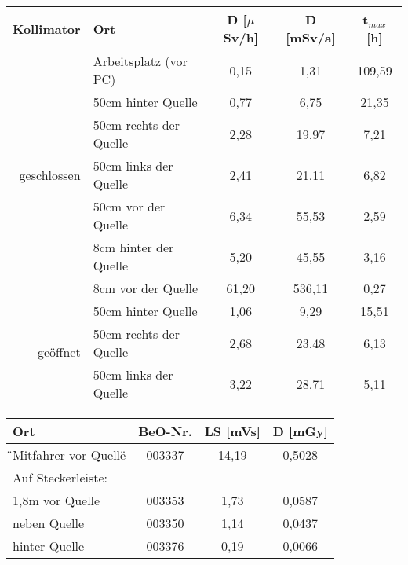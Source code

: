 \minipanf
	\begin{center}
					\begin{tabular}{rl|c|c|c}
								\textbf{Kollimator} & \textbf{Ort} & \textbf{\.D} [$\mu$Sv/h] & \textbf{\.D} [mSv/a]  & \textbf{t$_{max}$} [h]\\ 
						\hline  \multirow{7}{*}{geschlossen} &Arbeitsplatz (vor PC) & 0,15  &   1,31 & 109,59\\ 
							  &	50cm hinter Quelle    & 0,77  &   6,75 &  21,35\\ 
							  &	50cm rechts der Quelle& 2,28  &  19,97 &   7,21\\ 
							  &	50cm links der Quelle & 2,41  &  21,11 &   6,82\\ 
							  &	50cm vor der Quelle   & 6,34  &  55,53 &   2,59\\ 
							  &	8cm hinter der Quelle & 5,20  &  45,55 &   3,16\\ 
							  &	8cm vor der Quelle    & 61,20 & 536,11 &   0,27\\
						\hline \multirow{3}{*}{geöffnet} & 50cm hinter Quelle    & 1,06  &   9,29 &  15,51\\
							  &	50cm rechts der Quelle& 2,68  &  23,48 &   6,13\\ 
							  &	50cm links der Quelle & 3,22  &  28,71 &   5,11\\
					\end{tabular}	
					\label{dft:Arbeitsplatz}
    \end{center}
\minipend
\vspace{1mm}
\minipanf
   \begin{center}
                    \vspace{8mm}
					\begin{tabular}{l|c|c|c}
								\textbf{Ort} & \textbf{BeO-Nr.} & \textbf{LS} [mVs] & \textbf{D} [mGy] \\
						\hline  \"{}Mitfahrer vor Quelle\" & 003337 & 14,19 & 0,5028 \\
								Auf Steckerleiste:                &        &       &        \\
								 \hspace{3mm} 1,8m vor Quelle     & 003353 & 1,73  & 0,0587 \\
								 \hspace{3mm} neben Quelle        & 003350 & 1,14  & 0,0437 \\
								 \hspace{3mm} hinter Quelle       & 003376 & 0,19  & 0,0066 \\
					\end{tabular}
					\label{dft:Raum}
                    \vspace{8mm}
	\end{center}
\minipend
	
